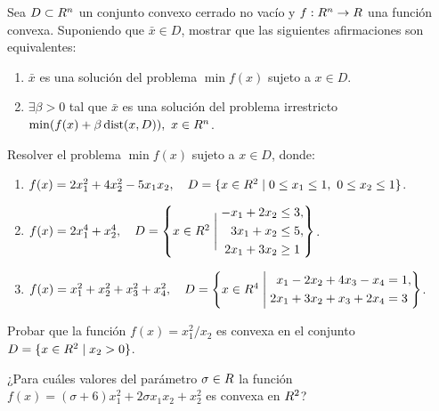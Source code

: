 \begin{exercise}\label{v1:ejer:3.4.13}
 Sea $D \subset R^n$ un conjunto convexo cerrado no vacío y $f: R^n \to R$ una función convexa. Suponiendo que $\bar{x} \in D$, mostrar que las siguientes afirmaciones son equivalentes:
 \begin{enumerate}[label=(\alph*)]
  \item $\bar{x}$ es una solución del problema $\min f(x)$ sujeto a $x \in D$.
  \item $\exists \beta > 0$ tal que $\bar{x}$ es una solución del problema irrestricto $\min (f(x) + \beta \operatorname{dist}(x, D)), \ x \in R^n$.
 \end{enumerate}
\end{exercise}

\begin{exercise}\label{v1:ejer:3.4.14}
 Resolver el problema $\min f(x)$ sujeto a $x \in D$, donde:
 \begin{enumerate}[label=(\alph*)]
  \item $f(x) = 2x_1^2 + 4x_2^2 - 5x_1 x_2, \quad D = \{ x \in R^2 \mid 0 \le x_1 \le 1, \ 0 \le x_2 \le 1 \}$.
  \item $f(x) = 2x_1^4 + x_2^4, \quad D = \left\{ x \in R^2 \mathrel{\Bigg|} \begin{aligned} -x_1 + 2x_2 &\le 3, \\ 3x_1 + x_2 &\le 5, \\ 2x_1 + 3x_2 &\ge 1 \end{aligned} \right\}$.
  \item $f(x) = x_1^2 + x_2^2 + x_3^2 + x_4^2, \quad D = \left\{ x \in R^4 \mathrel{\Bigg|} \begin{aligned} x_1 - 2x_2 + 4x_3 - x_4 &= 1, \\ 2x_1 + 3x_2 + x_3 + 2x_4 &= 3 \end{aligned} \right\}$.
 \end{enumerate}
\end{exercise}

\begin{exercise}\label{v1:ejer:3.4.15}
 Probar que la función $f(x) = x_1^2 / x_2$ es convexa en el conjunto $D = \{ x \in R^2 \mid x_2 > 0 \}$.
\end{exercise}

\begin{exercise}\label{v1:ejer:3.4.16}
 ¿Para cuáles valores del parámetro $\sigma \in R$ la función $f(x) = (\sigma + 6)x_1^2 + 2\sigma x_1 x_2 + x_2^2$ es convexa en $R^2$?
\end{exercise}

